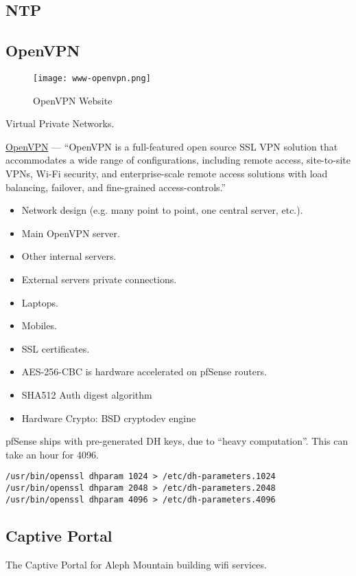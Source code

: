 \subsection{NTP}


\subsection{OpenVPN}
\begin{figure}[h!]
\texttt{[image: www-openvpn.png]}
 \caption{OpenVPN Website}
 \label{fig:www-openvpn}
\end{figure}


Virtual Private Networks.


\href{https://www.openvpn.net/}{OpenVPN} --- ``OpenVPN is a full-featured open source SSL VPN solution that accommodates a wide range of configurations, including remote access, site-to-site VPNs, Wi-Fi security, and enterprise-scale remote access solutions with load balancing, failover, and fine-grained access-controls.''

\begin{itemize}
 \item Network design (e.g. many point to point, one central server, etc.).
 \item Main OpenVPN server.
 \item Other internal servers.
 \item External servers private connections.
 \item Laptops.
 \item Mobiles.
 \item SSL certificates.
 \item AES-256-CBC is hardware accelerated on pfSense routers.
 \item SHA512 Auth digest algorithm
 \item Hardware Crypto: BSD cryptodev engine
\end{itemize}


pfSense ships with pre-generated DH keys, due to ``heavy computation''.
This can take an hour for 4096.
\begin{verbatim}
/usr/bin/openssl dhparam 1024 > /etc/dh-parameters.1024
/usr/bin/openssl dhparam 2048 > /etc/dh-parameters.2048
/usr/bin/openssl dhparam 4096 > /etc/dh-parameters.4096
\end{verbatim}



\subsection{Captive Portal}
The Captive Portal for Aleph Mountain building wifi services.


